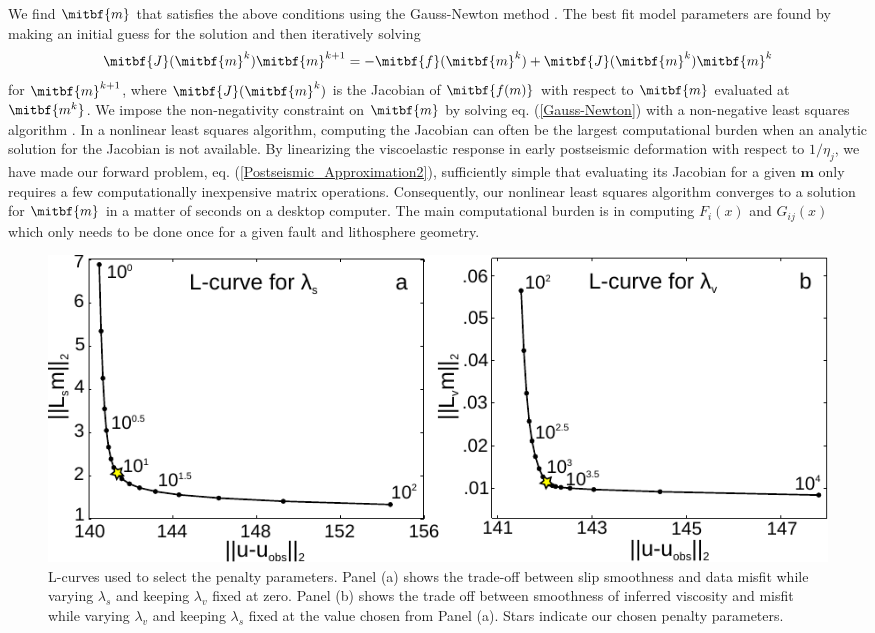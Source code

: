 \documentclass[extra,mreferee]{gji}
\begin{document}
We find $\mitbf{m}$ that satisfies the above conditions using the
Gauss-Newton method \citep[e.g.][]{A2013}.  The best fit model parameters are
found by making an initial guess for the solution and then iteratively
solving
\begin{equation}\label{Gauss-Newton}
\mitbf{J}(\mitbf{m}^{k})\mitbf{m}^{k+1} = -\mitbf{f}(\mitbf{m}^k) + \mitbf{J}(\mitbf{m}^{k})\mitbf{m}^{k}
\end{equation}
for $\mitbf{m}^{k+1}$, where $\mitbf{J}(\mitbf{m}^k)$ is the Jacobian
of $\mitbf{f(m)}$ with respect to $\mitbf{m}$ evaluated at
$\mitbf{m^k}$. We impose the non-negativity constraint on $\mitbf{m}$
by solving eq. (\ref{Gauss-Newton}) with a non-negative least squares
algorithm \citep{LH1974}. In a nonlinear least squares algorithm,
computing the Jacobian can often be the largest computational burden
when an analytic solution for the Jacobian is not available. By
linearizing the viscoelastic response in early postseismic deformation
with respect to $1/\eta_j$, we have made our forward problem,
eq. (\ref{Postseismic_Approximation2}), sufficiently simple that
evaluating its Jacobian for a given $\mathbf{m}$ only requires a few
computationally inexpensive matrix operations. Consequently, our
nonlinear least squares algorithm converges to a solution for
$\mitbf{m}$ in a matter of seconds on a desktop computer.  The main
computational burden is in computing $F_i(x)$ and $G_{ij}(x)$ which
only needs to be done once for a given fault and lithosphere geometry.

\begin{figure}\label{figure2}
  \centering
  \includegraphics{figures/Fig2.pdf}
  \caption{L-curves used to select the penalty parameters. Panel (a)
    shows the trade-off between slip smoothness and data misfit while
    varying $\lambda_s$ and keeping $\lambda_v$ fixed at zero.  Panel
    (b) shows the trade off between smoothness of inferred viscosity and
    misfit while varying $\lambda_v$ and keeping $\lambda_s$ fixed at
    the value chosen from Panel (a).  Stars indicate our chosen penalty
    parameters.}
  \label{Figure 2}
\end{figure}
\end{document}
